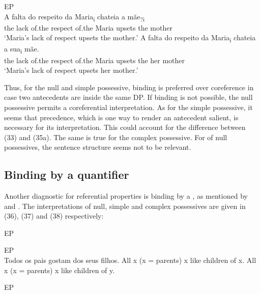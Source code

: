 \documentclass[output=paper]{langsci/langscibook}
\begin{document}
\ea%
         EP\label{ex:wein:35}\\
    \ea            
    \gll A falta do respeito da Maria\textsubscript{i} chateia a mãe\textsubscript{?i}\\
         the lack of.the respect of.the Maria upsets the mother\\
    \glt ‘Maria’s lack of respect upsets the mother.’
    \ex  
    \gll A falta do respeito da Maria\textsubscript{i} chateia a sua\textsubscript{i} mãe.\\
         the lack of.the respect of.the Maria upsets the her mother\\
    \glt ‘Maria’s lack of respect upsets her mother.’
    \z
\z

Thus, for the null and simple possessive, binding is preferred over coreference in case two antecedents are inside the same DP. If binding is not possible, the null possessive permits a coreferential interpretation. As for the simple possessive, it seems that precedence, which is one way to render an antecedent salient, is necessary for its interpretation. This could account for the difference between (33) and (35a). The same is true for the complex possessive. For  of null possessives, the sentence structure seems not to be relevant.

\subsection{Binding by a quantifier}%

Another diagnostic for referential properties is binding by a , as mentioned by \citet{Barker2011} and \citet{Mateus2003}. The interpretations of null, simple and complex possessives are given in (36), (37) and (38) respectively:

\ea%
    EP\label{ex:wein:36}\\
    \z
\z    

\ea%
        EP\label{ex:wein:37}\\
    \ea Todos os pais gostam dos seus filhos.
    \ex All x (x = parents) x like children of x.
    \ex All x (x = parents) x like children of y.
    \z  
\z


\ea%
    EP\label{ex:wein:38}\\
    \z
\z
\end{document}
